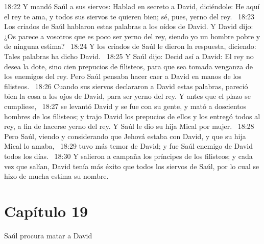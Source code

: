 18:22 Y mandó Saúl a sus siervos: Hablad en secreto a David, diciéndole: He aquí el rey te ama, y todos sus siervos te quieren bien; sé, pues, yerno del rey.  
18:23 Los criados de Saúl hablaron estas palabras a los oídos de David. Y David dijo: ¿Os parece a vosotros que es poco ser yerno del rey, siendo yo un hombre pobre y de ninguna estima?  
18:24 Y los criados de Saúl le dieron la respuesta, diciendo: Tales palabras ha dicho David.  
18:25 Y Saúl dijo: Decid así a David: El rey no desea la dote, sino cien prepucios de filisteos, para que sea tomada venganza de los enemigos del rey. Pero Saúl pensaba hacer caer a David en manos de los filisteos.  
18:26 Cuando sus siervos declararon a David estas palabras, pareció bien la cosa a los ojos de David, para ser yerno del rey. Y antes que el plazo se cumpliese,  
18:27 se levantó David y se fue con su gente, y mató a doscientos hombres de los filisteos; y trajo David los prepucios de ellos y los entregó todos al rey, a fin de hacerse yerno del rey. Y Saúl le dio su hija Mical por mujer.  
18:28 Pero Saúl, viendo y considerando que Jehová estaba con David, y que su hija Mical lo amaba,  
18:29 tuvo más temor de David; y fue Saúl enemigo de David todos los días.  
18:30 Y salieron a campaña los príncipes de los filisteos; y cada vez que salían, David tenía más éxito que todos los siervos de Saúl, por lo cual se hizo de mucha estima su nombre.  
\section*{Capítulo 19}
Saúl procura matar a David  

